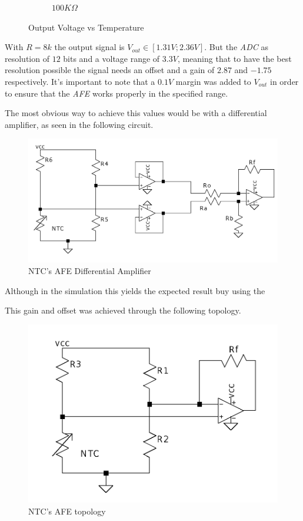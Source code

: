 \documentclass[12pt]{article}
\begin{document}
\begin{figure}[h]
\begin{subfigure}{0.45\textwidth}
            \caption{$100K\Omega$}
        \end{subfigure}
        \caption{Output Voltage vs Temperature}
    \end{figure}


    With $R=8k$ the output signal is $V_{out} \in [1.31V;2.36V]$. 
    But the \textit{ADC} as resolution of $12$ bits and a voltage range of $3.3V$, meaning that to have the best resolution possible the signal needs an offset and a gain of $2.87$ and $-1.75$ respectively. 
    It's important to note that a $0.1V$ margin was added to $V_{out}$ in order to ensure that the \textit{AFE} works properly in the specified range.
    
    The most obvious way to achieve this values would be with a differential amplifier, 
    as seen in the following circuit.

     \begin{figure}[H] 
        \centering
        \includegraphics*[scale = 0.25]{images/AFENTCDiffAmp.png}
        \caption{NTC's AFE Differential Amplifier}
        \label{wrap-fig:1}
    \end{figure}

    Although in the simulation this yields the expected result buy using the 
    
    This gain and offset was achieved through the following topology.
    
    \begin{figure}[H] 
        \centering
        \includegraphics*[scale = 0.25]{images/AFENTC.png}
        \caption{NTC's AFE topology}
        \label{wrap-fig:1}
    \end{figure}
\end{document}
